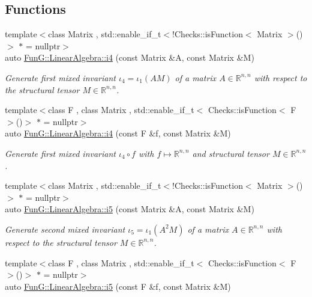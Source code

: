 \subsection*{\-Functions}
\begin{DoxyCompactItemize}
\item 
{\footnotesize template$<$class Matrix , std\-::enable\-\_\-if\-\_\-t$<$!\-Checks\-::is\-Function$<$ Matrix $>$()$>$ $\ast$  = nullptr$>$ }\\auto \hyperlink{group__InvariantGroup_ga1898785172ecce11af0c27e54d555009}{\-Fun\-G\-::\-Linear\-Algebra\-::i4} (const \-Matrix \&\-A, const \-Matrix \&\-M)
\begin{DoxyCompactList}\small\item\em \-Generate first mixed invariant $ \iota_4=\iota_1(AM) $ of a matrix $A\in\mathbb{R}^{n,n}$ with respect to the structural tensor $M\in\mathbb{R}^{n,n}$. \end{DoxyCompactList}\item 
{\footnotesize template$<$class F , class Matrix , std\-::enable\-\_\-if\-\_\-t$<$ Checks\-::is\-Function$<$ F $>$()$>$ $\ast$  = nullptr$>$ }\\auto \hyperlink{group__InvariantGroup_ga0df96cdb1e4b8b5a040f2adc97c51100}{\-Fun\-G\-::\-Linear\-Algebra\-::i4} (const \-F \&f, const \-Matrix \&\-M)
\begin{DoxyCompactList}\small\item\em \-Generate first mixed invariant $ \iota_4\circ f $ with $f\mapsto\mathbb{R}^{n,n}$ and structural tensor $M\in\mathbb{R}^{n,n}$. \end{DoxyCompactList}\item 
{\footnotesize template$<$class Matrix , std\-::enable\-\_\-if\-\_\-t$<$!\-Checks\-::is\-Function$<$ Matrix $>$()$>$ $\ast$  = nullptr$>$ }\\auto \hyperlink{group__InvariantGroup_gabedc42182203d883278e29fd16b355a0}{\-Fun\-G\-::\-Linear\-Algebra\-::i5} (const \-Matrix \&\-A, const \-Matrix \&\-M)
\begin{DoxyCompactList}\small\item\em \-Generate second mixed invariant $ \iota_5=\iota_1(A^2M) $ of a matrix $A\in\mathbb{R}^{n,n}$ with respect to the structural tensor $M\in\mathbb{R}^{n,n}$. \end{DoxyCompactList}\item 
{\footnotesize template$<$class F , class Matrix , std\-::enable\-\_\-if\-\_\-t$<$ Checks\-::is\-Function$<$ F $>$()$>$ $\ast$  = nullptr$>$ }\\auto \hyperlink{group__InvariantGroup_gaed7e47c39d89f2b01e25c992da78b44d}{\-Fun\-G\-::\-Linear\-Algebra\-::i5} (const \-F \&f, const \-Matrix \&\-M)

\end{DoxyCompactItemize}
